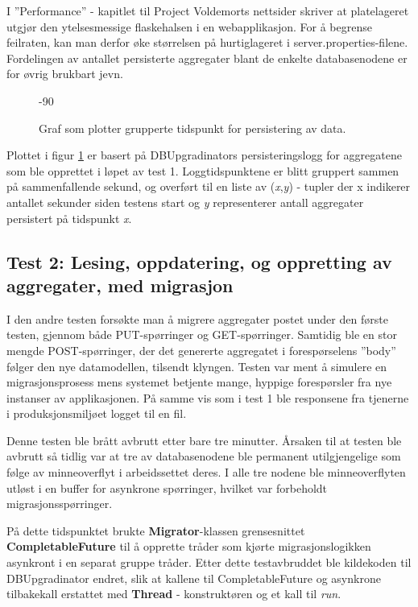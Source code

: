I ''Performance'' - kapitlet til Project Voldemorts nettsider skriver \cite{kreps2009} at platelageret utgjør den ytelsesmessige flaskehalsen i en webapplikasjon. For å begrense feilraten, kan man derfor øke størrelsen på hurtiglageret i server.properties-filene. Fordelingen av antallet persisterte aggregater blant de enkelte databasenodene er for øvrig brukbart jevn.

\begin{figure}[hbtp]
  \begin{turn}{-90}
    
  \end{turn}{-90}
  \caption{Graf som plotter grupperte tidspunkt for persistering av data.}
  \label{plott1}
\end{figure}

Plottet i figur \ref{plott1} er basert på DBUpgradinators persisteringslogg for aggregatene som ble opprettet  i løpet av test 1. Loggtidspunktene er blitt gruppert sammen på sammenfallende sekund, og overført til en liste av (\emph{x},\emph{y}) - tupler der x indikerer antallet sekunder siden testens start og \emph{y} representerer antall aggregater persistert på tidspunkt \emph{x}.

\subsection{Test 2: Lesing, oppdatering, og oppretting av aggregater, med migrasjon}

I den andre testen forsøkte man å migrere aggregater postet under den første testen, gjennom både PUT-spørringer og GET-spørringer. Samtidig ble en stor mengde POST-spørringer, der det genererte aggregatet i forespørselens ''body'' følger den nye datamodellen, tilsendt klyngen. Testen var ment å simulere en migrasjonsprosess mens systemet betjente mange, hyppige forespørsler fra nye instanser av applikasjonen. På samme vis som i test 1 ble responsene fra tjenerne i produksjonsmiljøet logget til en fil.




Denne testen ble brått avbrutt etter bare tre minutter. Årsaken til at testen ble avbrutt så tidlig var at tre av databasenodene ble permanent utilgjengelige som følge av minneoverflyt i arbeidssettet deres. I alle tre nodene ble minneoverflyten utløst i en buffer for asynkrone spørringer, hvilket var forbeholdt migrasjonsspørringer.

På dette tidspunktet brukte \textbf{Migrator}-klassen grensesnittet \textbf{CompletableFuture} til å opprette tråder som kjørte migrasjonslogikken asynkront i en separat gruppe tråder. Etter dette testavbruddet ble kildekoden til DBUpgradinator endret, slik at kallene til CompletableFuture og asynkrone tilbakekall erstattet med \textbf{Thread} - konstruktøren og et kall til \emph{run}.

